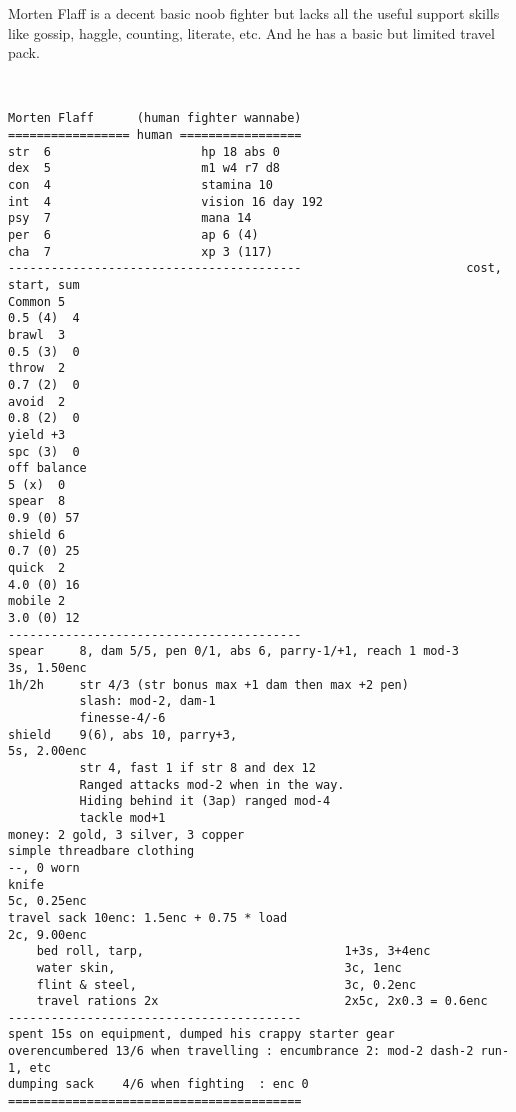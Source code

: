\clearpage
\begin{samepage}

\noindent Morten Flaff is a decent basic noob fighter but lacks all the useful support skills like gossip, haggle, counting, literate, etc. And he has a basic but limited travel pack.

\

\small \begin{verbatim}
Morten Flaff      (human fighter wannabe)
================= human =================
str  6                     hp 18 abs 0
dex  5                     m1 w4 r7 d8
con  4                     stamina 10
int  4                     vision 16 day 192
psy  7                     mana 14
per  6                     ap 6 (4)
cha  7                     xp 3 (117)
-----------------------------------------                       cost, start, sum
Common 5                                                              0.5 (4)  4
brawl  3                                                              0.5 (3)  0
throw  2                                                              0.7 (2)  0
avoid  2                                                              0.8 (2)  0
yield +3                                                              spc (3)  0
off balance                                                             5 (x)  0
spear  8                                                              0.9 (0) 57
shield 6                                                              0.7 (0) 25
quick  2                                                              4.0 (0) 16
mobile 2                                                              3.0 (0) 12
-----------------------------------------
spear     8, dam 5/5, pen 0/1, abs 6, parry-1/+1, reach 1 mod-3      3s, 1.50enc
1h/2h     str 4/3 (str bonus max +1 dam then max +2 pen)
          slash: mod-2, dam-1
          finesse-4/-6
shield    9(6), abs 10, parry+3,                                     5s, 2.00enc
          str 4, fast 1 if str 8 and dex 12
          Ranged attacks mod-2 when in the way.
          Hiding behind it (3ap) ranged mod-4
          tackle mod+1
money: 2 gold, 3 silver, 3 copper
simple threadbare clothing                                            --, 0 worn
knife                                                                5c, 0.25enc
travel sack 10enc: 1.5enc + 0.75 * load                              2c, 9.00enc
    bed roll, tarp,                            1+3s, 3+4enc
    water skin,                                3c, 1enc
    flint & steel,                             3c, 0.2enc
    travel rations 2x                          2x5c, 2x0.3 = 0.6enc
-----------------------------------------
spent 15s on equipment, dumped his crappy starter gear
overencumbered 13/6 when travelling : encumbrance 2: mod-2 dash-2 run-1, etc
dumping sack    4/6 when fighting  : enc 0
=========================================
\end{verbatim} \end{samepage} \normalsize





